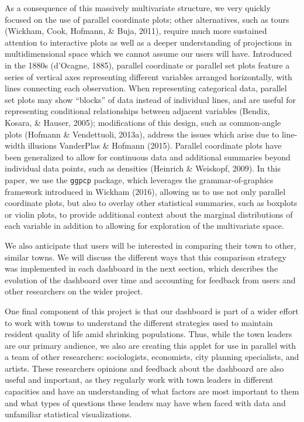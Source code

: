 \documentclass[print]{nuthesis}
\begin{document}
As a consequence of this massively multivariate structure, we very quickly focused on the use of parallel coordinate plots; other alternatives, such as tours (Wickham, Cook, Hofmann, \& Buja, 2011), require much more sustained attention to interactive plots as well as a deeper understanding of projections in multidimensional space which we cannot assume our users will have. Introduced in the 1880s (d'Ocagne, 1885), parallel coordinate or parallel set plots feature a series of vertical axes representing different variables arranged horizontally, with lines connecting each observation. When representing categorical data, parallel set plots may show ``blocks'' of data instead of individual lines, and are useful for representing conditional relationships between adjacent variables (Bendix, Kosara, \& Hauser, 2005); modifications of this design, such as common-angle plots (Hofmann \& Vendettuoli, 2013a), address the issues which arise due to line-width illusions VanderPlas \& Hofmann (2015). Parallel coordinate plots have been generalized to allow for continuous data and additional summaries beyond individual data points, such as densities (Heinrich \& Weiskopf, 2009). In this paper, we use the \texttt{ggpcp} package, which leverages the grammar-of-graphics framework introduced in Wickham (2016), allowing us to use not only parallel coordinate plots, but also to overlay other statistical summaries, such as boxplots or violin plots, to provide additional context about the marginal distributions of each variable in addition to allowing for exploration of the multivariate space.

We also anticipate that users will be interested in comparing their town to other, similar towns. We will discuss the different ways that this comparison strategy was implemented in each dashboard in the next section, which describes the evolution of the dashboard over time and accounting for feedback from users and other researchers on the wider project.

One final component of this project is that our dashboard is part of a wider effort to work with towns to understand the different strategies used to maintain resident quality of life amid shrinking populations. Thus, while the town leaders are our primary audience, we also are creating this applet for use in parallel with a team of other researchers: sociologists, economists, city planning specialists, and artists. These researchers opinions and feedback about the dashboard are also useful and important, as they regularly work with town leaders in different capacities and have an understanding of what factors are most important to them and what types of questions these leaders may have when faced with data and unfamiliar statistical visualizations.
\end{document}
